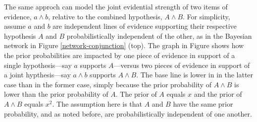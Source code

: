 \documentclass[10pt,dvipsnames,enabledeprecatedfontcommands]{scrartcl}
\begin{document}
The same approch can model the joint evidential strength of two items of
evidence, \(a \wedge b\), relative to the combined hypothesis,
\(A \wedge B\). For simplicity, assume \(a\) and \(b\) are independent
lines of evidence supporting their respective hypothesis \(A\) and \(B\)
probabilistically independent of the other, as in the Bayesian network
in Figure \ref{network-conjunction} (top). The graph in Figure
\label{fig:strength-indiv-joint} shows how the prior probabilities are
impacted by one piece of evidence in support of a single
hypothesis---say \(a\) supports \(A\)---versus two pieces of evidence in
support of a joint hypthesis---say \(a\wedge b\) supports
\(A \wedge B\). The base line is lower in in the latter case than in the
former case, simply because the prior probability of \(A \wedge B\) is
lower than the prior probability of \(A\). The prior of \(A\) equals
\(x\) and the prior of \(A\wedge B\) equals \(x^2\). The assumption here
is that \(A\) and \(B\) have the same prior probability, and as noted
before, are probabilistically independent of one another.
\end{document}
